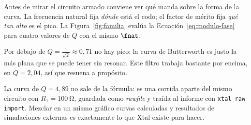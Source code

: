Antes de mirar el circuito armado conviene ver qué manda sobre la forma de la
curva. La frecuencia natural fija \emph{dónde} está el codo; el factor de mérito
fija \emph{qué tan alto} es el pico. La Figura~\ref{fig:familia} evalúa la
Ecuación~\eqref{eq:modulo-fase} para cuatro valores de $Q$ con el mismo $\fnat$.

Por debajo de $Q = \tfrac{1}{\sqrt{2}} \approx 0{,}71$ no hay pico: la curva de
Butterworth es justo la más plana que se puede tener sin resonar. Este filtro
trabaja bastante por encima, en $Q = 2{,}04$, así que resuena a propósito.

La curva de $Q = 4{,}89$ no sale de la fórmula: es una corrida aparte del mismo
circuito con $R_1 = \SI{100}{\ohm}$, guardada como \emph{rawfile} y traída al
informe con \texttt{xtal raw import}. Mezclar en un mismo gráfico curvas
calculadas y resultados de simulaciones externas es exactamente lo que Xtal
existe para hacer.
